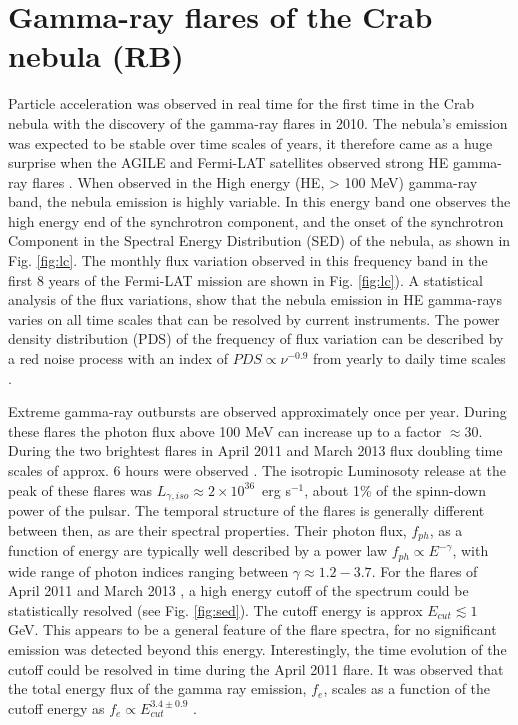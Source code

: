\section{Gamma-ray flares of the Crab nebula (RB)}
\label{sec:flares}

Particle acceleration was observed in real time for the first time in the Crab nebula with the discovery of the gamma-ray flares in 2010.  The nebula's emission was expected to  be stable over time scales of years, it therefore came as a huge surprise when the AGILE and Fermi-LAT satellites observed strong HE gamma-ray flares \citep{Tavani2011,Abdo2011}. When observed in the High energy (HE, > 100 MeV) gamma-ray band, the nebula emission is highly variable. In this energy band one observes the high energy end of the synchrotron component, and the onset of the synchrotron Component in the Spectral Energy Distribution (SED) of the nebula, as shown in Fig. \ref{fig:lc}. The monthly flux variation observed in this frequency band in the first 8 years of the Fermi-LAT mission are shown in Fig. \ref{fig:lc}). A statistical analysis of the flux variations, show that the nebula emission in HE gamma-rays varies on all time scales that can be resolved by current instruments. The power density distribution (PDS) of the frequency of flux variation can be described by a red noise process with an index of $PDS \propto \nu^{-0.9}$  from yearly to daily time scales \citep{buehler2012}.

Extreme gamma-ray outbursts are observed approximately once per year. During these flares the photon flux above 100 MeV can increase up to a factor $\approx 30$. During the two brightest flares in April 2011 and March 2013 flux doubling time scales of approx. 6 hours were observed \citep{buehler2012,Mayer2013}. The isotropic Luminosoty release at the peak of these flares was $L_{\gamma, iso} \approx 2 \times 10^{36}$~erg s$^{-1}$, about 1\% of the spinn-down power of the pulsar. The temporal structure of the flares is generally different between then, as are their spectral properties. Their photon flux, $f_{ph}$,  as a function of energy are typically well described by a power law $f_{ph} \propto E^{-\gamma}$, with  wide range of photon indices ranging between  $\gamma \approx 1.2 - 3.7$. For the flares of April 2011 and March 2013 , a high energy cutoff of the spectrum could be statistically resolved (see Fig. \ref{fig:sed}). The cutoff energy is approx $E_{cut} \lesssim 1$ GeV. This appears to be a general feature of the flare spectra, for no significant emission was detected beyond this energy. Interestingly, the time evolution of the cutoff could be resolved in time during the April 2011 flare. It was observed that the total energy flux of the gamma ray emission, $f_e$,  scales as a function of the cutoff energy as $f_e \propto E_{cut}^{3.4 \pm 0.9}$  \citep{buehler2012}.

